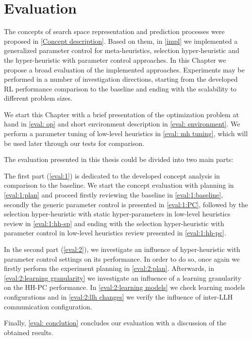 \chapter{Evaluation}\label{eval}
The concepts of search space representation and prediction processes were proposed in \cref{Concept description}. Based on them, in \cref{impl} we implemented a generalized parameter control for meta-heuristics, selection hyper-heuristic and the hyper-heuristic with parameter control approaches. In this Chapter we propose a broad evaluation of the implemented approaches. Experiments may be performed in a number of investigation directions, starting from the developed RL performance comparison to the baseline and ending with the scalability to different problem sizes.

We start this Chapter with a brief presentation of the optimization problem at hand in \cref{eval: op} and short environment description in \cref{eval: environment}. We perform a parameter tuning of low-level heuristics in \cref{eval: mh tuning}, which will be used later through our tests for comparison. 

The evaluation presented in this thesis could be divided into two main parts:

The first part (\cref{eval:1}) is dedicated to the developed concept analysis in comparison to the baseline. We start the concept evaluation with planning in \cref{eval:1:plan} and proceed firstly reviewing the baseline in \cref{eval:1:baseline}, secondly the generic parameter control is presented in \cref{eval:1:PC}, followed by the selection hyper-heuristic with static hyper-parameters in low-level heuristics review in \cref{eval:1:hh-sp} and ending with the selection hyper-heuristic with parameter control in low-level heuristics review presented in \cref{eval:1:hh-pc}.

In the second part (\cref{eval:2}), we investigate an influence of hyper-heuristic with parameter control settings on its performance. In order to do so, once again we firstly perform the experiment planning in \cref{eval:2:plan}. Afterwards, in \cref{eval:2:learning granularity} we investigate an influence of a learning granularity on the HH-PC performance. In \cref{eval:2:learning models} we check learning models configurations and in \cref{eval:2:llh changes} we verify the influence of inter-LLH communication configuration.

Finally, \cref{eval: conclution} concludes our evaluation with a discussion of the obtained results.


